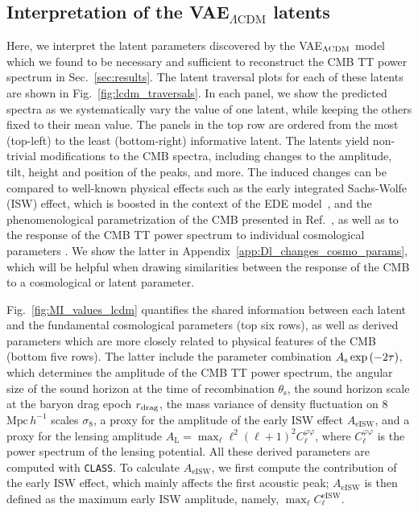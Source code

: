 \documentclass[aps, prd, reprint, superscriptaddress, nofootinbib, bibnotes]{revtex4-2}
\begin{document}
\subsection{Interpretation of the VAE$_{\Lambda \mathrm{CDM}}$ latents}
\label{sec:interpretLCDMlatents}
Here, we interpret the latent parameters discovered by the VAE$_{\Lambda\rm{CDM}}$ model which we found to be necessary and sufficient to reconstruct the CMB TT power spectrum in Sec.~\ref{sec:results}.
The latent traversal plots for each of these latents are shown in Fig.~\ref{fig:lcdm_traversals}. In each panel, we show the predicted spectra as we systematically vary the value of one latent, while keeping the others fixed to their mean value. The panels in the top row are ordered from the most (top-left) to the least (bottom-right) informative latent. The latents yield non-trivial modifications to the CMB spectra, including changes to the amplitude, tilt, height and position of the peaks, and more. The induced changes can be compared to well-known physical effects such as the early integrated Sachs-Wolfe (ISW) effect, which is boosted in the context of the EDE model~\cite{Vagnozzi:2021gjh}, and the phenomenological parametrization of the CMB presented in Ref.~\cite{Hu_2001}, as well as to the response of the CMB TT power spectrum to individual cosmological parameters \cite{Komatsu2020}. We show the latter in Appendix~\ref{app:Dl_changes_cosmo_params}, which will be helpful when drawing similarities between the response of the CMB to a cosmological or latent parameter.

Fig.~\ref{fig:MI_values_lcdm} quantifies the shared information between each latent and the fundamental cosmological parameters (top six rows), as well as derived parameters which are more closely related to physical features of the CMB (bottom five rows). The latter include the parameter combination $A_{\rm{s}} \exp{(-2\tau)}$, which determines the amplitude of the CMB TT power spectrum, the angular size of the sound horizon at the time of recombination $\theta_\mathrm{s}$, the sound horizon scale at the baryon drag epoch $r_{\rm{drag}}$, the mass variance of density fluctuation on 8 $\textrm{Mpc}\, h^{-1}$ scales $\sigma_8$, a proxy for the amplitude of the early ISW effect $A_\mathrm{eISW}$, and a proxy for the lensing amplitude $A_{\mathrm{L}}=\max_{\ell} \ell^2 (\ell+1)^2 C_{\ell}^{\varphi\varphi}$, where $C_{\ell}^{\varphi\varphi}$ is the power spectrum of the lensing potential. All these derived parameters are computed with \texttt{CLASS}. To calculate $A_\mathrm{eISW}$, we first compute the contribution of the early ISW effect, which mainly affects the first acoustic peak; $A_\mathrm{eISW}$ is then defined as the maximum early ISW amplitude, namely, $\max_{\ell} C_{\ell}^\mathrm{eISW}$. 
\end{document}
